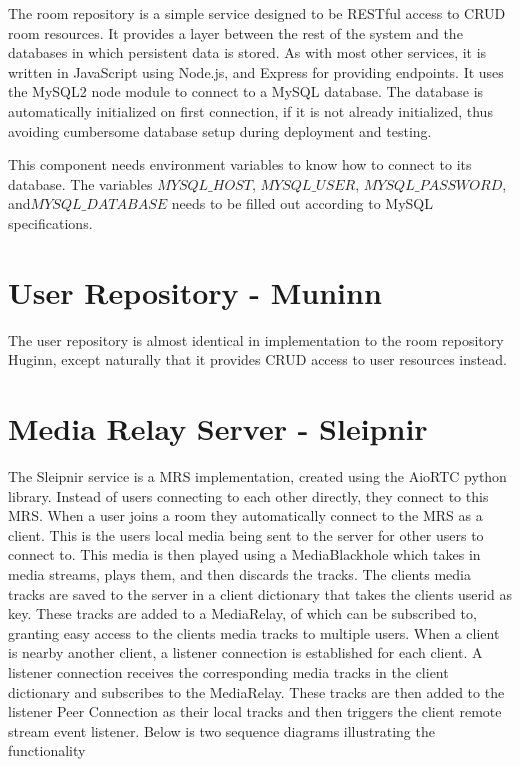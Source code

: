 The room repository is a simple service designed to be RESTful access to CRUD room resources. It provides a layer between the rest of the system and the databases in which persistent data is stored. As with most other services, it is written in JavaScript using Node.js, and Express for providing endpoints. It uses the MySQL2 node module to connect to a MySQL database. The database is automatically initialized on first connection, if it is not already initialized, thus avoiding cumbersome database setup during deployment and testing.

This component needs environment variables to know how to connect to its database. The variables $MYSQL\_HOST$, $MYSQL\_USER$, $MYSQL\_PASSWORD$, and\newline$MYSQL\_DATABASE$ needs to be filled out according to MySQL specifications.

\section{User Repository - Muninn}

The user repository is almost identical in implementation to the room repository Huginn, except naturally that it provides CRUD access to user resources instead.

\section{Media Relay Server - Sleipnir}

The Sleipnir service is a MRS implementation, created using the AioRTC python library. Instead of users connecting to each other directly, they connect to this MRS. When a user joins a room they automatically connect to the MRS as a client. This is the users local media being sent to the server for other users to connect to. This media is then played using a MediaBlackhole which takes in media streams, plays them, and then discards the tracks. The clients media tracks are saved to the server in a client dictionary that takes the clients userid as key. These tracks are added to a MediaRelay, of which can be subscribed to, granting easy access to the clients media tracks to multiple users. When a client is nearby another client, a listener connection is established for each client. A listener connection receives the corresponding media tracks in the client dictionary and subscribes to the MediaRelay. These tracks are then added to the listener Peer Connection as their local tracks and then triggers the client remote stream event listener. Below is two sequence diagrams illustrating the functionality


